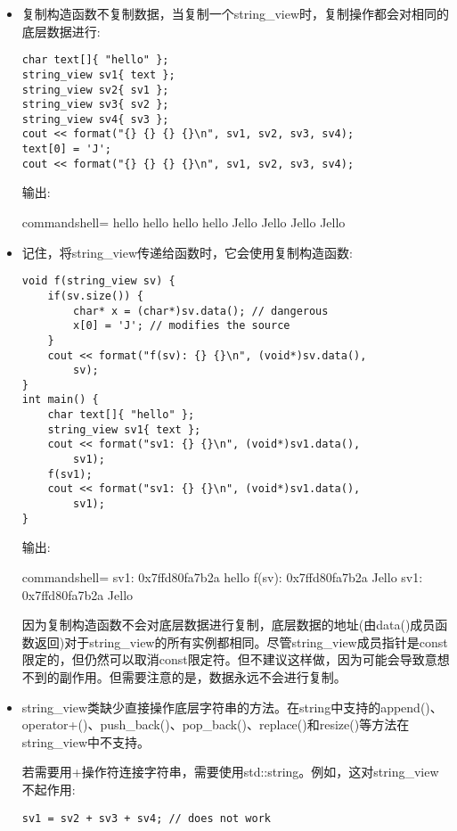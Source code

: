 \begin{itemize}
\item 
复制构造函数不复制数据，当复制一个string\_view时，复制操作都会对相同的底层数据进行:

\begin{lstlisting}[style=styleCXX]
char text[]{ "hello" };
string_view sv1{ text };
string_view sv2{ sv1 };
string_view sv3{ sv2 };
string_view sv4{ sv3 };
cout << format("{} {} {} {}\n", sv1, sv2, sv3, sv4);
text[0] = 'J';
cout << format("{} {} {} {}\n", sv1, sv2, sv3, sv4);
\end{lstlisting}

输出:

\begin{tcblisting}{commandshell={}}
hello hello hello hello
Jello Jello Jello Jello
\end{tcblisting}

\item 
记住，将string\_view传递给函数时，它会使用复制构造函数:

\begin{lstlisting}[style=styleCXX]
void f(string_view sv) {
	if(sv.size()) {
		char* x = (char*)sv.data(); // dangerous
		x[0] = 'J'; // modifies the source
	}
	cout << format("f(sv): {} {}\n", (void*)sv.data(),
		sv);
}
int main() {
	char text[]{ "hello" };
	string_view sv1{ text };
	cout << format("sv1: {} {}\n", (void*)sv1.data(),
		sv1);
	f(sv1);
	cout << format("sv1: {} {}\n", (void*)sv1.data(),
		sv1);
}
\end{lstlisting}

输出:

\begin{tcblisting}{commandshell={}}
sv1: 0x7ffd80fa7b2a hello
f(sv): 0x7ffd80fa7b2a Jello
sv1: 0x7ffd80fa7b2a Jello
\end{tcblisting}

因为复制构造函数不会对底层数据进行复制，底层数据的地址(由data()成员函数返回)对于string\_view的所有实例都相同。尽管string\_view成员指针是const限定的，但仍然可以取消const限定符。但不建议这样做，因为可能会导致意想不到的副作用。但需要注意的是，数据永远不会进行复制。

\item 
string\_view类缺少直接操作底层字符串的方法。在string中支持的append()、operator+()、push\_back()、pop\_back()、replace()和resize()等方法在string\_view中不支持。

若需要用+操作符连接字符串，需要使用std::string。例如，这对string\_view不起作用:

\begin{lstlisting}[style=styleCXX]
sv1 = sv2 + sv3 + sv4; // does not work
\end{lstlisting}


\end{itemize}
